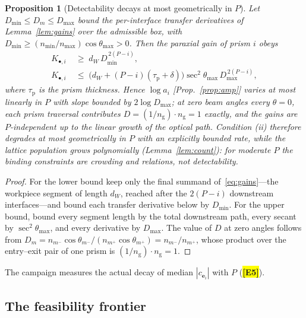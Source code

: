 \documentclass[twocolumn,preprintnumbers,amsmath,amssymb,pra,floatfix]{revtex4-2}
\newcommand{\vect}[1]{\bm{#1}}
\newtheorem{proposition}{Proposition}
\newcommand{\PH}[1]{\colorbox{yellow}{\textbf{\small [#1]}}}
\begin{document}
\begin{proposition}[Detectability decays at most geometrically in $P$]
\label{prop:detscale}
Let $D_{\min}\le D_m\le D_{\max}$ bound the per-interface transfer
derivatives of Lemma~\ref{lem:gains} over the admissible box, with
$D_{\min}\ge(n_{\min}/n_{\max})\cos\theta_{\max}>0$.  Then the
paraxial gain of prism $i$ obeys
\begin{align}
  K_{\bullet,i}&\;\ge\;d_{W}\,D_{\min}^{\,2(P-i)},
  \label{eq:gainbounds}\\
  K_{\bullet,i}&\;\le\;
  \bigl(d_{W}+(P{-}i)(\tau_{\mathrm{p}}{+}\delta)\bigr)
  \sec^{2}\!\theta_{\max}\,D_{\max}^{\,2(P-i)},
  \nonumber
\end{align}
where $\tau_{\mathrm{p}}$ is the prism thickness.  Hence $\log a_i$
[Prop.~\ref{prop:amp}] varies at most linearly in $P$ with slope
bounded by $2\log D_{\max}$; at zero beam angles every $\theta=0$,
each prism traversal contributes
$D=(1/n_{\mathrm{g}})\cdot n_{\mathrm{g}}=1$ exactly, and the gains
are $P$-independent up to the linear growth of the optical path.
Condition (ii) therefore degrades at most geometrically in $P$ with
an explicitly bounded rate, while the lattice population grows
polynomially (Lemma~\ref{lem:count}): for moderate $P$ the binding
constraints are crowding and relations, not detectability.
\end{proposition}
\begin{proof}
For the lower bound keep only the final summand
of~\eqref{eq:gains}---the workpiece segment of length $d_W$, reached
after the $2(P-i)$ downstream interfaces---and bound each transfer
derivative below by $D_{\min}$.  For the upper bound, bound every
segment length by the total downstream path, every secant by
$\sec^{2}\theta_{\max}$, and every derivative by $D_{\max}$.  The
value of $D$ at zero angles follows from
$D_m=n_{m^-}\cos\theta_{m^-}/(n_{m^+}\cos\theta_{m^+})
=n_{m^-}/n_{m^+}$, whose product over the entry--exit pair of one
prism is $(1/n_{\mathrm{g}})\cdot n_{\mathrm{g}}=1$.
\end{proof}
The campaign measures the actual decay of median
$|c_{\vect{e}_i}|$ with $P$ (\PH{E5}).

\subsection{The feasibility frontier}
\end{document}
